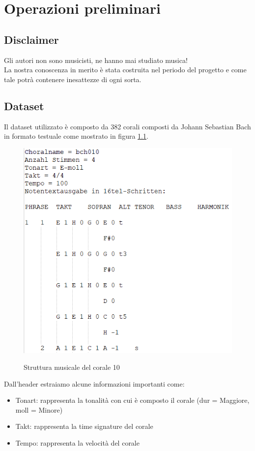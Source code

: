 \chapter{Operazioni preliminari}\label{ch:th-music}

\section{Disclaimer}
Gli autori non sono musicisti, ne hanno mai studiato musica! \\
La nostra conoscenza in merito è stata costruita nel periodo del progetto e come tale potrà contenere inesattezze di ogni sorta.

\section{Dataset}
Il dataset utilizzato è composto da 382 corali composti da Johann Sebastian Bach in formato testuale come mostrato in figura \ref{music-notation}.
\begin{figure}[H]
	\caption{Struttura musicale del corale 10}
	\includegraphics{figures/music-notation.png}
	\label{music-notation}
\end{figure}
\noindent
Dall'header estraiamo alcune informazioni importanti come:
\begin{itemize}
\item Tonart: rappresenta la tonalità con cui è composto il corale (dur = Maggiore, moll = Minore)
\item Takt: rappresenta la time signature del corale
\item Tempo: rappresenta la velocità del corale
\end{itemize}
